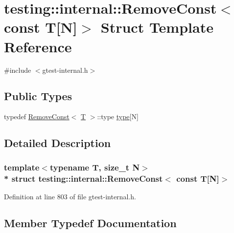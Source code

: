 \hypertarget{structtesting_1_1internal_1_1_remove_const_3_01const_01_t[_n]_4}{}\section{testing\+:\+:internal\+:\+:Remove\+Const$<$ const T\mbox{[}N\mbox{]}$>$ Struct Template Reference}
\label{structtesting_1_1internal_1_1_remove_const_3_01const_01_t[_n]_4}


{\ttfamily \#include $<$gtest-\/internal.\+h$>$}

\subsection*{Public Types}
\begin{DoxyCompactItemize}
\item 
typedef \hyperlink{structtesting_1_1internal_1_1_remove_const}{Remove\+Const}$<$ \hyperlink{functions__7_8js_adf1f3edb9115acb0a1e04209b7a9937b}{T} $>$\+::type \hyperlink{structtesting_1_1internal_1_1_remove_const_3_01const_01_t[_n]_4_ac976b53cb5d031a120fafbe790650068}{type}\mbox{[}N\mbox{]}
\end{DoxyCompactItemize}


\subsection{Detailed Description}
\subsubsection*{template$<$typename T, size\+\_\+t N$>$\\*
struct testing\+::internal\+::\+Remove\+Const$<$ const T\mbox{[}\+N\mbox{]}$>$}



Definition at line 803 of file gtest-\/internal.\+h.



\subsection{Member Typedef Documentation}
